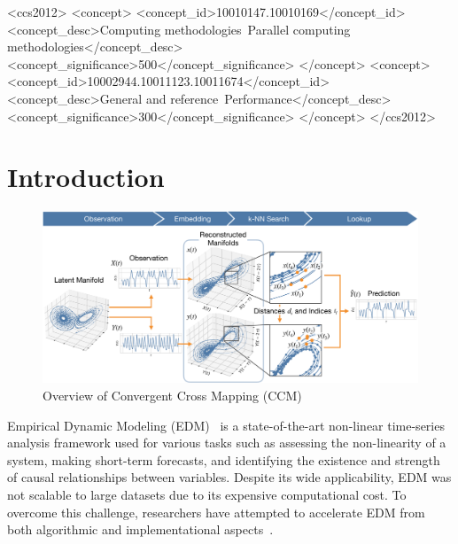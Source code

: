 \documentclass[sigconf]{acmart}
\begin{document}

\begin{CCSXML}
<ccs2012>
   <concept>
       <concept_id>10010147.10010169</concept_id>
       <concept_desc>Computing methodologies~Parallel computing methodologies</concept_desc>
       <concept_significance>500</concept_significance>
       </concept>
   <concept>
       <concept_id>10002944.10011123.10011674</concept_id>
       <concept_desc>General and reference~Performance</concept_desc>
       <concept_significance>300</concept_significance>
       </concept>
 </ccs2012>
\end{CCSXML}


\maketitle

\section{Introduction}

\begin{figure}
    \centering
    \includegraphics[width=.95\linewidth]{figs/xmap_overview}
    \caption{Overview of Convergent Cross Mapping (CCM)}\label{fig:edm}
\end{figure}

Empirical Dynamic Modeling (EDM)~\cite{Chang2017} is a state-of-the-art
non-linear time-series analysis framework used for various tasks such as
assessing the non-linearity of a system, making short-term forecasts, and
identifying the existence and strength of causal relationships between
variables. Despite its wide applicability, EDM was not scalable to large
datasets due to its expensive computational cost. To overcome this challenge,
researchers have attempted to accelerate EDM from both algorithmic and
implementational aspects~\cite{Pu2019,Ma2014}.
\end{document}
